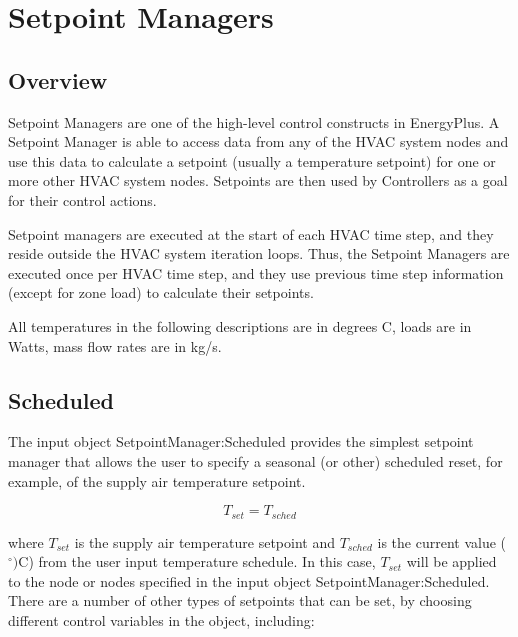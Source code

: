 \section{Setpoint Managers }\label{setpoint-managers}

\subsection{Overview}\label{overview-024}

Setpoint Managers are one of the high-level control constructs in EnergyPlus. A Setpoint Manager is able to access data from any of the HVAC system nodes and use this data to calculate a setpoint (usually a temperature setpoint) for one or more other HVAC system nodes. Setpoints are then used by Controllers as a goal for their control actions.

Setpoint managers are executed at the start of each HVAC time step, and they reside outside the HVAC system iteration loops. Thus, the Setpoint Managers are executed once per HVAC time step, and they use previous time step information (except for zone load) to calculate their setpoints.

All temperatures in the following descriptions are in degrees C, loads are in Watts, mass flow rates are in kg/s.

\subsection{Scheduled}\label{scheduled}

The input object SetpointManager:Scheduled provides the simplest setpoint manager that allows the user to specify a seasonal (or other) scheduled reset, for example, of the supply air temperature setpoint.

\begin{equation}
{T_{set}} = {T_{sched}}
\end{equation}

where \({T_{set}}\) is the supply air temperature setpoint and \({T_{sched}}\) is the current value (\(^{\circ})\)C) from the user input temperature schedule. In this case, \({T_{set}}\) will be applied to the node or nodes specified in the input object SetpointManager:Scheduled.~ There are a number of other types of setpoints that can be set, by choosing different control variables in the object, including:

